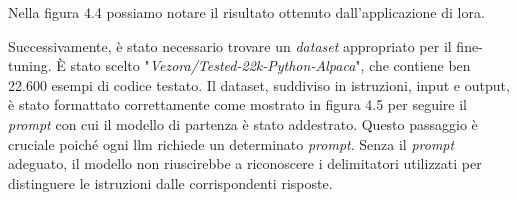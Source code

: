     Nella figura 4.4 possiamo notare il risultato ottenuto dall'applicazione di \gls{lora}. 
    
    
    Successivamente, è stato necessario trovare un \textit{dataset} appropriato per il \gls{fine-tuning}. È stato scelto "\textit{Vezora/Tested-22k-Python-Alpaca}", che contiene ben 22.600 esempi di codice testato. Il dataset, suddiviso in istruzioni, input e output, è stato formattato correttamente come mostrato in figura 4.5 per seguire il \textit{prompt} con cui il modello di partenza è stato addestrato. Questo passaggio è cruciale poiché ogni \gls{llm} richiede un determinato \textit{prompt}. Senza il \textit{prompt} adeguato, il modello non riuscirebbe a riconoscere i delimitatori utilizzati per distinguere le istruzioni dalle corrispondenti risposte.

